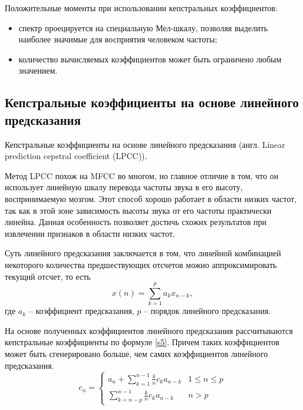 Положительные моменты при использовании кепстральных коэффициентов:
\begin{itemize}
	\item спектр проецируется на специальную Мел-шкалу, позволяя выделить наиболее значимые для восприятия человеком частоты;
	\item количество вычисляемых коэффициентов может быть ограничено любым значением.
\end{itemize}


	
\subsection{Кепстральные коэффициенты на основе линейного предсказания} \label{2}
Кепстральные коэффициенты на основе линейного предсказания (англ. Linear prediction cepstral coefficient (LPCC)). 

Метод LPCC похож на MFCC во многом, но главное отличие в том, что он использует линейную шкалу перевода частоты звука в его высоту, воспринимаемую мозгом. Этот способ хорошо работает в области низких частот, так как в этой зоне зависимость высоты звука от его частоты практически линейна. Данная особенность позволяет достичь схожих	результатов при извлечении признаков в области низких частот. \cite{methodisb}


Суть линейного предсказания заключается в том, что линейной комбинацией некоторого количества предшествующих отсчетов можно аппроксимировать текущий отсчет, то есть
\begin{equation}
	\label{H}
	x(n) = \sum_{k = 1}^{p} a_k x_{n-k},
\end{equation}
где $a_k$ -- коэффициент предсказания, $p$ -- порядок линейного предсказания.

На основе полученных коэффициентов линейного предсказания рассчитываются кепстральные коэффициенты по формуле \eqref{s5}. Причем таких коэффициентов может быть сгенерировано больше, чем самих коэффициентов линейного предсказания.
\begin{equation}
	\label{s5}
	c_n = \left\{\begin{matrix}
		a_n + \sum_{k=1}^{n-1} \frac{k}{n} c_k a_{n-k}& 1\leq n\leq p\\ 
		\sum_{k=n-p}^{n-1} \frac{k}{n} c_k a_{n-k}& n>p
	\end{matrix}\right.
\end{equation}

	
